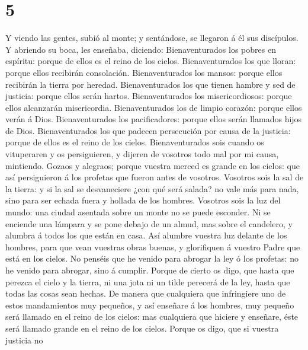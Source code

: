 \hypertarget{section-4}{%
\section{5}\label{section-4}}

 Y viendo las gentes, subió al monte; y sentándose, se
llegaron á él sus discípulos.  Y abriendo su boca, les
enseñaba, diciendo:  Bienaventurados los pobres en espíritu:
porque de ellos es el reino de los cielos.  Bienaventurados
los que lloran: porque ellos recibirán consolación. 
Bienaventurados los mansos: porque ellos recibirán la tierra por
heredad.  Bienaventurados los que tienen hambre y sed de
justicia: porque ellos serán hartos.  Bienaventurados los
misericordiosos: porque ellos alcanzarán misericordia. 
Bienaventurados los de limpio corazón: porque ellos verán á Dios.
 Bienaventurados los pacificadores: porque ellos serán
llamados hijos de Dios.  Bienaventurados los que padecen
persecución por causa de la justicia: porque de ellos es el reino de los
cielos.  Bienaventurados sois cuando os vituperaren y os
persiguieren, y dijeren de vosotros todo mal por mi causa, mintiendo.
 Gozaos y alegraos; porque vuestra merced es grande en los
cielos: que así persiguieron á los profetas que fueron antes de
vosotros.  Vosotros sois la sal de la tierra: y si la sal
se desvaneciere ¿con qué será salada? no vale más para nada, sino para
ser echada fuera y hollada de los hombres.  Vosotros sois
la luz del mundo: una ciudad asentada sobre un monte no se puede
esconder.  Ni se enciende una lámpara y se pone debajo de
un almud, mas sobre el candelero, y alumbra á todos los que están en
casa.  Así alumbre vuestra luz delante de los hombres, para
que vean vuestras obras buenas, y glorifiquen á vuestro Padre que está
en los cielos.  No penséis que he venido para abrogar la
ley ó los profetas: no he venido para abrogar, sino á cumplir.
 Porque de cierto os digo, que hasta que perezca el cielo y
la tierra, ni una jota ni un tilde perecerá de la ley, hasta que todas
las cosas sean hechas.  De manera que cualquiera que
infringiere uno de estos mandamientos muy pequeños, y así enseñare á los
hombres, muy pequeño será llamado en el reino de los cielos: mas
cualquiera que hiciere y enseñare, éste será llamado grande en el reino
de los cielos.  Porque os digo, que si vuestra justicia no
